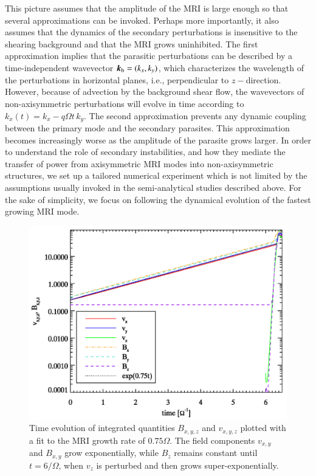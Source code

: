 \documentclass[]{emulateapj}
\newcommand\bb[1]{\mbox{\boldmath{$#1$}}}
\begin{document}
This picture assumes that the amplitude of the MRI is large enough so
that several approximations can be invoked. Perhaps more importantly,
it also assumes that the dynamics of the secondary perturbations is insensitive to the
shearing background and that the MRI grows uninhibited.  The first
approximation implies that the parasitic perturbations can be
described by a time-independent wavevector $\bb{k}_{\rm h} = (k_x,
k_y)$, which characterizes the wavelength of the perturbations in
horizontal planes, i.e., perpendicular to $z-$direction. However,
because of advection by the background shear flow, the wavevectors of
non-axisymmetric perturbations will evolve in time according to
$k_x(t) = k_{x} - q\Omega t \, k_y$.  The second approximation
prevents any dynamic coupling between the primary mode and the
secondary parasites. This approximation becomes increasingly worse as
the amplitude of the parasite grows larger.   In order to understand
the role of secondary instabilities, and how they mediate the transfer
of power from axisymmetric MRI modes into non-axisymmetric structures,
we set up a tailored numerical experiment which is not limited by the
assumptions usually invoked in the semi-analytical studies described
above.  For the sake of simplicity, we focus on following the
dynamical evolution of the fastest growing MRI mode.


\begin{figure}[t]
\begin{center}
\includegraphics[width=0.95 \columnwidth]{f5.png}
\caption{
Time evolution of integrated quantities $B_{x,y,z}$ and $v_{x,y,z}$
plotted with a fit to the MRI growth rate of $0.75\Omega$. 
The field components $v_{x,y}$ and $B_{x,y}$ grow exponentially, while
$B_z$ remains constant until $t=6/\Omega$, when $v_z$
is perturbed and then grows super-exponentially.  
}
\label{fig:incompressiblemrigrowthrates}
\end{center}
\end{figure}
\end{document}
